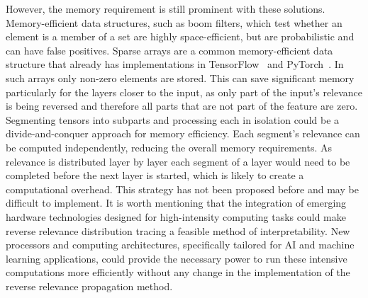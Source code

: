 However, the memory requirement is still prominent with these solutions. Memory-efficient data structures, such as boom filters, which test whether an element is a member of a set are highly space-efficient, but are probabilistic and can have false positives. Sparse arrays are a common memory-efficient data structure that already has implementations in TensorFlow~\cite{tensorflow2015} and PyTorch~\cite{NEURIPS2019_9015}. In such arrays only non-zero elements are stored. This can save significant memory particularly for the layers closer to the input, as only part of the input's relevance is being reversed and therefore all parts that are not part of the feature are zero. Segmenting tensors into subparts and processing each in isolation could be a divide-and-conquer approach for memory efficiency. Each segment's relevance can be computed independently, reducing the overall memory requirements. As relevance is distributed layer by layer each segment of a layer would need to be completed before the next layer is started, which is likely to create a computational overhead.
This strategy has not been proposed before and may be difficult to implement. It is worth mentioning that the integration of emerging hardware technologies designed for high-intensity computing tasks could make reverse relevance distribution tracing a feasible method of interpretability. New processors and computing architectures, specifically tailored for AI and machine learning applications, could provide the necessary power to run these intensive computations more efficiently without any change in the implementation of the reverse relevance propagation method.


